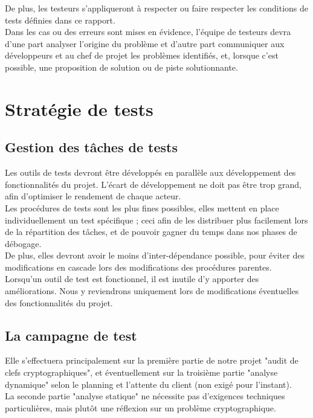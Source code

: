 \documentclass[a4paper,11pt,french]{article}
\begin{document}
De plus, les testeurs s'appliqueront à respecter ou faire respecter les conditions de tests définies dans ce rapport.\\

Dans les cas ou des erreurs sont mises en évidence, l'équipe de testeurs devra d'une part analyser l'origine du problème et d'autre part communiquer aux développeurs et au chef de projet les problèmes identifiés, et, lorsque c'est possible, une proposition de solution ou de piste solutionnante.


\section{Stratégie de tests}

\subsection{Gestion des tâches de tests}

Les outils de tests devront être développés en parallèle aux développement des fonctionnalités du projet. L'écart de développement ne doit pas être trop grand, afin d'optimiser le rendement de chaque acteur.\\

Les procédures de tests sont les plus fines possibles, elles mettent en place individuellement un test spécifique ; ceci afin de les distribuer plus facilement lors de la répartition des tâches, et de pouvoir gagner du temps dans nos phases de débogage. \\

De plus, elles devront avoir le moins d'inter-dépendance possible, pour éviter des modifications en cascade lors des modifications des procédures parentes.
Lorsqu'un outil de test est fonctionnel, il est inutile d'y apporter des améliorations. Nous y reviendrons uniquement lors de modifications éventuelles des fonctionnalités du projet.

\subsection{La campagne de test}

Elle s'effectuera principalement sur la première partie de notre projet "audit de clefs cryptographiques", et éventuellement sur la troisième partie "analyse dynamique" selon le planning et l'attente du client (non exigé pour l'instant).\\

La seconde partie "analyse statique" ne nécessite pas d'exigences techniques particulières, mais plutôt une réflexion sur un problème cryptographique.
\end{document}
